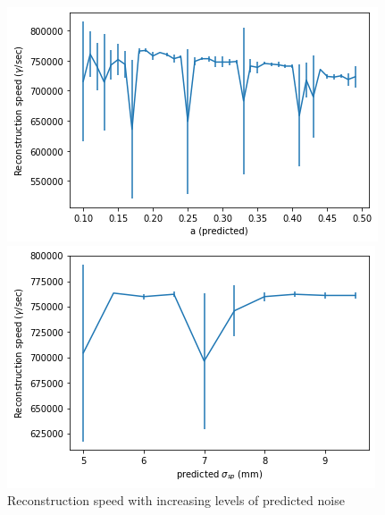 \begin{figure}
        \centering
        \begin{minipage}{0.49\textwidth} \centering
        \includegraphics[width=\textwidth]{graphs/pi_enFactor_speed.png}
        \end{minipage}
        \begin{minipage}{0.49\textwidth} \centering
        \includegraphics[width=\textwidth]{graphs/pi_spFactor_speed.png}
        \end{minipage}
        \caption{Reconstruction speed with increasing levels of predicted noise}
        \label{fig:predicted_speed}
\end{figure}

